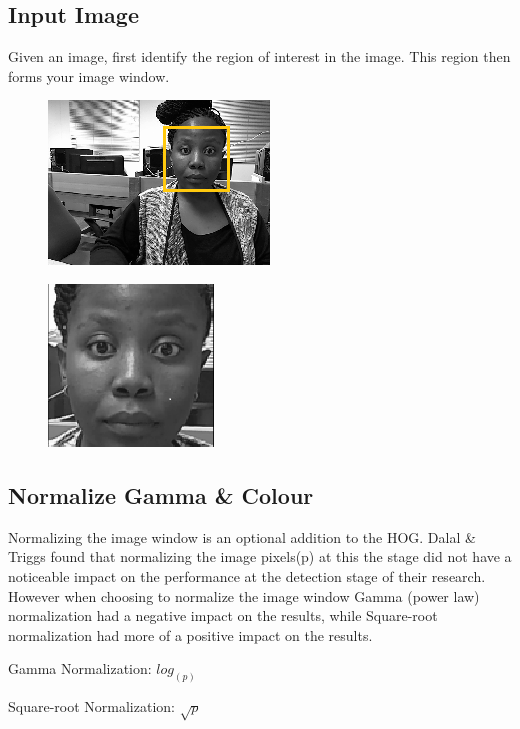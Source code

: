 \subsection{Input Image}
Given an image, first identify the region of interest in the image. This region then forms your image window.
\begin{figure}[H]
\centering
\begin{minipage}{.5\textwidth}
  \centering
  \includegraphics[width=.4\linewidth]{image}
  \label{fig:test1}
\end{minipage}%
\begin{minipage}{.5\textwidth}
  \centering
  \includegraphics[width=.4\linewidth]{roi}
  \label{fig:test2}
\end{minipage}
\end{figure}
\subsection{Normalize Gamma \& Colour}
Normalizing the image window is an optional addition to the HOG. Dalal \& Triggs found that normalizing the image pixels(p) at this the stage did not have a noticeable impact on the performance at the detection stage of their research.
However when choosing to normalize the image window Gamma (power law) normalization had a negative impact on the results, while Square-root normalization had more of a positive impact on the results.

Gamma Normalization: $log_(p)$ 

Square-root Normalization: $\sqrt{p}$

